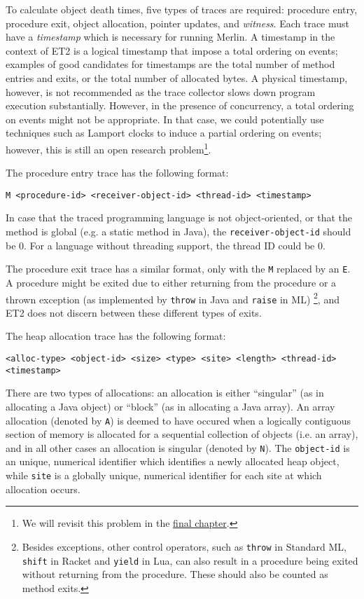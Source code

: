 To calculate object death times, five types of traces are required: procedure entry, procedure exit, object allocation, pointer updates, and \emph{witness}. Each trace must have a \emph{timestamp} which is necessary for running Merlin. A timestamp in the context of
ET2 is a logical timestamp that impose a total ordering on events; examples of good candidates for timestamps are the total number of 
method entries and exits, or the total number of allocated bytes. A physical timestamp, however, is not recommended as the trace
collector slows down program execution substantially. However, in the presence of concurrency, a total ordering on events might not be
appropriate. In that case, we could potentially use techniques such as Lamport clocks \citep{LamportClock} to induce a partial ordering
on events; however, this is still an open research problem\footnote{We will revisit this problem in the
\hyperref[chap:conclusion]{final chapter}.}.

The procedure entry trace has the following format:

\begin{verbatim}
M <procedure-id> <receiver-object-id> <thread-id> <timestamp>
\end{verbatim}

In case that the traced programming language is not object-oriented, or that the method is global (e.g. a static method in Java), the
\lstinline{receiver-object-id} should be 0. For a language without threading support, the thread ID could be 0.

The procedure exit trace has a similar format, only with the \lstinline{M} replaced by an \lstinline{E}. A procedure might be
exited due to either returning from the procedure or a thrown exception (as implemented by \lstinline{throw} in Java and
\lstinline{raise} in ML)
\footnote{Besides exceptions, other control operators, such as \lstinline{throw} in Standard ML, \lstinline{shift} in Racket and
  \lstinline{yield} in Lua, can also result in a procedure being exited without returning from the procedure. These should also be
  counted as method exits.}, and ET2 does not discern between these different types of exits.

The heap allocation trace has the following format:

\begin{verbatim}
<alloc-type> <object-id> <size> <type> <site> <length> <thread-id> <timestamp>
\end{verbatim}

There are two types of allocations: an allocation is either ``singular'' (as in allocating a Java object) or ``block'' (as in
allocating a Java array). An array allocation (denoted by \lstinline{A}) is deemed to have occured when a logically contiguous
section of memory is allocated for a sequential collection of objects (i.e. an array), and in all other cases an allocation is
singular (denoted by \lstinline{N}). The \lstinline{object-id} is an unique, numerical identifier which identifies a newly allocated
heap object, while \lstinline{site} is a globally unique, numerical identifier for each site at which allocation occurs. 
